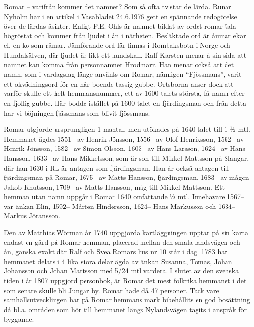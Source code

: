 
Romar – varifrån kommer det namnet? Som så ofta tvistar de lärda. Runar Nyholm har i en artikel i Vasabladet 24.6.1976 gett en spännande redogörelse över de lärdas åsikter. Enligt P.E. Ohls är namnet bildat av ordet romar \= tala högröstat och kommer från ljudet i ån i närheten. Besläktade ord är åumar \= ekar el. en ko som råmar. Jämförande ord lär finnas i Rombaksbotn i Norge och Hundalsälven, där ljudet är likt ett hundskall. Ralf Karsten menar å sin sida att namnet kan komma från personnamnet Hrodmarr. Han menar också att det namn, som i vardagslag länge använts om Romar, nämligen ``Fjössmans'', varit ett okvädningsord för en här boende tassig gubbe. Ortsborna anser dock att varför skulle ett helt hemmansnummer, ett av 1600-talets största, få namn efter en fjollig gubbe. Här bodde istället på 1600-talet en fjärdingsman och från detta har vi böjningen fjässmans som blivit fjössmans.

Romar utgjorde ursprungligen 1 mantal, men utökades på 1640-talet till 1 ½ mtl. Hemmanet ägdes 1551-- av Henrik Jönsson,  1556-- av Olof Henriksson, 1562-- av Henrik Jönsson, 1582-- av Simon Olsson, 1603-- av Hans Larsson, 1624-- av Hans Hansson, 1633-- av Hans Mikkelsson, som är son till Mikkel Mattsson på Slangar, där han 1630 i RL är antagen som fjärdingsman. Han är också antagen till fjärdingsman på Romar, 1675-- av Matts Hansson, fjärdingsman, 1683-- av mågen Jakob Knutsson, 1709-- av Matts Hansson, måg till Mikkel Mattsson. Ett hemman utan namn uppgår i Romar 1640 omfattande ½ mtl. Innehavare 1567-- var änkan Elin, 1592-- Mårten Hindersson, 1624-- Hans Markusson och 1634-- Markus Jöransson.

Den av Matthias Wörman år 1740 uppgjorda kartläggningen upptar på sin karta endast en gård på Romar hemman, placerad mellan den smala landsvägen och ån, ganska exakt där Ralf och Svea Romars hus nr 10 står i dag. 1783 har hemmanet delats i 4 lika stora delar ägda av änkan Susanna, Tomas, Johan Johansson och Johan Mattsson med 5/24 mtl vardera. I slutet av den svenska tiden i år 1807 uppgjord personbok, är Romar det mest folkrika hemmanet i det som senare skulle bli Jungar by. Romar hade då 47 personer. Tack vare samhällsutvecklingen har på Romar hemmans mark bibehållits en god bosättning då bl.a. områden som hör till hemmanet längs Nylandsvägen tagits i anspråk för byggande.

